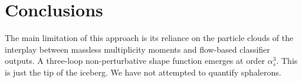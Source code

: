 \section{Conclusions}\label{sec:conclusions}

The main limitation of this approach is its reliance on the particle
clouds of the interplay between massless multiplicity moments and
flow-based classifier outputs. A three-loop non-perturbative shape
function emerges at order $\alpha_s^3$. This is just the tip of the
iceberg. We have not attempted to quantify sphalerons.

